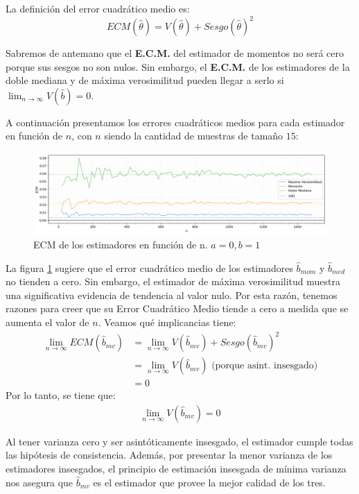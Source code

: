 La definición del error cuadrático medio es:
\begin{displaymath}
	ECM(\hat{\theta}) = V(\hat{\theta}) + Sesgo(\hat{\theta})^2
\end{displaymath}

Sabremos de antemano que el \textbf{E.C.M.} del estimador de momentos no será cero porque sus sesgos no son nulos. Sin embargo, el \textbf{E.C.M.} de los estimadores de la doble mediana y de máxima verosimilitud pueden llegar a serlo si $\lim_{n \to \infty} V(\hat{b}) = 0$.

\vskip 8pt

A continuación presentamos los errores cuadráticos medios para cada estimador en función de $n$, con $n$ siendo la cantidad de muestras de tamaño $15$:

\begin{figure}[H]
	\centering
	\includegraphics[width=1\textwidth]{imagenes/ecm-en-f-de-n-infinito.png}
	\caption{\footnotesize ECM de los estimadores en función de n. $a=0, b=1$}
	\label{fig:ej7-ecm-en-f-de-n}
\end{figure}

La figura \ref{fig:ej7-ecm-en-f-de-n} sugiere que el error cuadrático medio de los estimadores $\hat{b}_{mom}$ y $\hat{b}_{med}$ no tienden a cero. Sin embargo, el estimador de máxima verosimilitud muestra una significativa evidencia de tendencia al valor nulo. Por esta razón, tenemos razones para creer que su Error Cuadrático Medio tiende a cero a medida que se aumenta el valor de $n$. Veamos qué implicancias tiene:
\begin{align*}
	\lim_{n \to \infty} ECM(\hat{b}_{mv}) &= \lim_{n \to \infty} V(\hat{b}_{mv}) + Sesgo(\hat{b}_{mv})^2 \\
										  &= \lim_{n \to \infty} V(\hat{b}_{mv}) \text{ (porque asint. insesgado)} \\
										  &= 0
\end{align*}
Por lo tanto, se tiene que:
\begin{align*}
	\lim_{n \to \infty} V(\hat{b}_{mv}) = 0
\end{align*}

Al tener varianza cero y ser asintóticamente insesgado, el estimador cumple todas las hipótesis de consistencia. Además, por presentar la menor varianza de los estimadores insesgados, el principio de estimación insesgada de mínima varianza nos asegura que $\hat{b}_{mv}$ es el estimador que provee la mejor calidad de los tres.